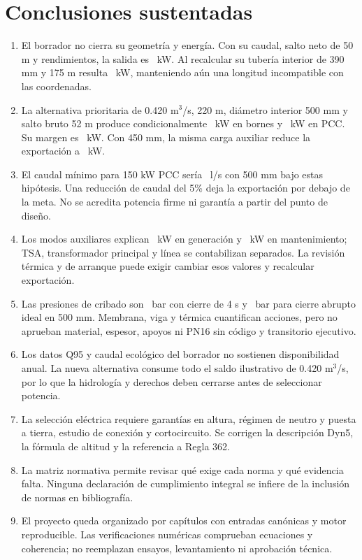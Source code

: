 \section{Conclusiones sustentadas}
\begin{enumerate}
\item El borrador no cierra su geometría y energía. Con su caudal, salto neto de 50 m y rendimientos, la salida es \POriginalCincuenta\ kW. Al recalcular su tubería interior de 390 mm y 175 m resulta \PBase\ kW, manteniendo aún una longitud incompatible con las coordenadas.
\item La alternativa prioritaria de 0.420 m$^3$/s, 220 m, diámetro interior 500 mm y salto bruto 52 m produce condicionalmente \PeAlt\ kW en bornes y \PExport\ kW en PCC. Su margen es \MargenExport\ kW. Con 450 mm, la misma carga auxiliar reduce la exportación a \PExportRef\ kW.
\item El caudal mínimo para 150 kW PCC sería \QObjetivo\ l/s con 500 mm bajo estas hipótesis. Una reducción de caudal del 5\% deja la exportación por debajo de la meta. No se acredita potencia firme ni garantía a partir del punto de diseño.
\item Los modos auxiliares explican \PAuxNormal\ kW en generación y \PAuxMax\ kW en mantenimiento; TSA, transformador principal y línea se contabilizan separados. La revisión térmica y de arranque puede exigir cambiar esos valores y recalcular exportación.
\item Las presiones de cribado son \PLento\ bar con cierre de 4 s y \PRapido\ bar para cierre abrupto ideal en 500 mm. Membrana, viga y térmica cuantifican acciones, pero no aprueban material, espesor, apoyos ni PN16 sin código y transitorio ejecutivo.
\item Los datos Q95 y caudal ecológico del borrador no sostienen disponibilidad anual. La nueva alternativa consume todo el saldo ilustrativo de 0.420 m$^3$/s, por lo que la hidrología y derechos deben cerrarse antes de seleccionar potencia.
\item La selección eléctrica requiere garantías en altura, régimen de neutro y puesta a tierra, estudio de conexión y cortocircuito. Se corrigen la descripción Dyn5, la fórmula de altitud y la referencia a Regla 362.
\item La matriz normativa permite revisar qué exige cada norma y qué evidencia falta. Ninguna declaración de cumplimiento integral se infiere de la inclusión de normas en bibliografía.
\item El proyecto queda organizado por capítulos con entradas canónicas y motor reproducible. Las verificaciones numéricas comprueban ecuaciones y coherencia; no reemplazan ensayos, levantamiento ni aprobación técnica.
\end{enumerate}

